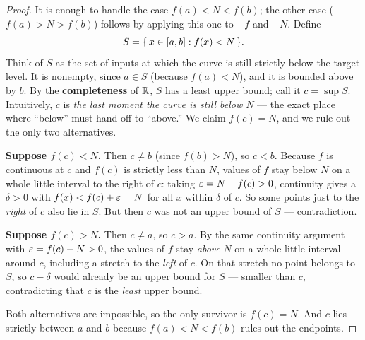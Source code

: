 \begin{proof}
It is enough to handle the case $f(a)<N<f(b)$; the other case ($f(a)>N>f(b)$) follows by
applying this one to $-f$ and $-N$. Define
\[
  S=\{\,x\in[a,b] : f(x)<N\,\}.
\]
Think of $S$ as the set of inputs at which the curve is still strictly below the target
level. It is nonempty, since $a\in S$ (because $f(a)<N$), and it is bounded above by $b$.
By the \textbf{completeness} of $\mathbb{R}$, $S$ has a least upper bound; call it $c=\sup S$.
Intuitively, $c$ is \emph{the last moment the curve is still below $N$} --- the exact place
where ``below'' must hand off to ``above.'' We claim $f(c)=N$, and we rule out the only two
alternatives.

\textbf{Suppose $f(c)<N$.} Then $c\ne b$ (since $f(b)>N$), so $c<b$. Because $f$ is
continuous at $c$ and $f(c)$ is strictly less than $N$, values of $f$ stay below $N$ on a
whole little interval to the right of $c$: taking $\varepsilon=N-f(c)>0$, continuity gives a
$\delta>0$ with $f(x)<f(c)+\varepsilon=N$ for all $x$ within $\delta$ of $c$. So some points just
to the \emph{right} of $c$ also lie in $S$. But then $c$ was not an upper bound of $S$ ---
contradiction.

\textbf{Suppose $f(c)>N$.} Then $c\ne a$, so $c>a$. By the same continuity argument with
$\varepsilon=f(c)-N>0$, the values of $f$ stay \emph{above} $N$ on a whole little interval around
$c$, including a stretch to the \emph{left} of $c$. On that stretch no point belongs to
$S$, so $c-\delta$ would already be an upper bound for $S$ --- smaller than $c$,
contradicting that $c$ is the \emph{least} upper bound.

Both alternatives are impossible, so the only survivor is $f(c)=N$. And $c$ lies strictly
between $a$ and $b$ because $f(a)<N<f(b)$ rules out the endpoints.
\end{proof}

